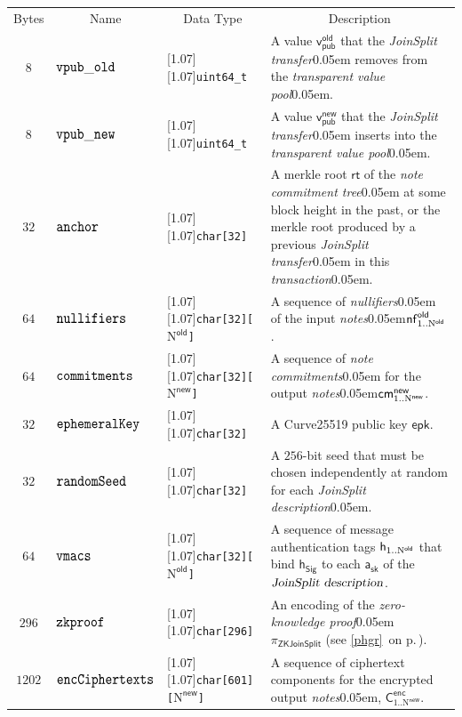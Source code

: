 \documentclass{article}
\renewcommand{\emph}[1]{\hspace{0.15em}{\fontfamily{pnc}\selectfont\scalebox{1.02}[0.999]{\textit{#1}}}\hspace{0.02em}}
\let\oldtexttt\texttt
\let\oldmathtt\mathtt
\renewcommand{\texttt}[1]{\scalebox{1.02}[1.07]{\oldtexttt{#1}}}
\renewcommand{\mathtt}[1]{\scalebox{1.02}[1.07]{$\oldmathtt{#1}$}}
\newcommand{\crossref}[1]{\autoref{#1}\, \emph{`\nameref*{#1}\kern -0.05em'} on p.\,\pageref*{#1}}
\newcommand{\changedcolor}{magenta}
\newcommand{\setchanged}{\color{\changedcolor}}
\numberwithin{theorem}{subsection}
\newcommand{\term}[1]{\textsl{#1}\kern 0.05em\xspace}
\newcommand{\notes}{\term{notes}}
\newcommand{\noteCommitments}{\term{note commitments}}
\newcommand{\noteCommitmentTree}{\term{note commitment tree}}
\newcommand{\joinSplitDescription}{\term{JoinSplit description}}
\newcommand{\joinSplitTransfer}{\term{JoinSplit transfer}}
\newcommand{\zeroKnowledgeProof}{\term{zero-knowledge proof}}
\newcommand{\transaction}{\term{transaction}}
\newcommand{\transparentValuePool}{\term{transparent value pool}}
\newcommand{\nullifiers}{\term{nullifiers}}
\newcommand{\AuthPrivate}{\mathsf{a_{sk}}}
\newcommand{\enc}{\mathsf{enc}}
\newcommand{\EphemeralPublic}{\mathsf{epk}}
\newcommand{\Ctext}{\mathsf{C}}
\newcommand{\TransmitCiphertext}[1]{\Ctext^\enc_{#1}}
\newcommand{\cmNew}[1]{\mathsf{{cm}^{new}_\mathnormal{#1}}}
\newcommand{\nf}{\mathsf{nf}}
\newcommand{\nfOld}[1]{\nf^\mathsf{old}_\mathnormal{#1}}
\newcommand{\vpubOldField}{\mathtt{vpub\_old}}
\newcommand{\vpubNewField}{\mathtt{vpub\_new}}
\newcommand{\anchorField}{\mathtt{anchor}}
\newcommand{\nullifiersField}{\mathtt{nullifiers}}
\newcommand{\commitments}{\mathtt{commitments}}
\newcommand{\ephemeralKey}{\mathtt{ephemeralKey}}
\newcommand{\encCiphertexts}{\mathtt{encCiphertexts}}
\newcommand{\randomSeed}{\mathtt{randomSeed}}
\newcommand{\heading}[1]{\multicolumn{1}{c|}{#1}}
\newcommand{\type}[1]{\texttt{#1}}
\newcommand{\JoinSplit}{\mathsf{ZKJoinSplit}}
\newcommand{\ProofJoinSplit}{\pi_\JoinSplit}
\newcommand{\zkproof}{\mathtt{zkproof}}
\newcommand{\hSig}{\mathsf{h_{Sig}}}
\newcommand{\h}[1]{\mathsf{h_{\mathnormal{#1}}}}
\newcommand{\NOld}{\mathrm{N}^\mathsf{old}}
\newcommand{\NNew}{\mathrm{N}^\mathsf{new}}
\newcommand{\allN}[1]{\mathrm{1}..\mathrm{N}^\mathsf{#1}}
\newcommand{\allOld}{\allN{old}}
\newcommand{\allNew}{\allN{new}}
\newcommand{\vmacs}{\mathtt{vmacs}}
\newcommand{\vpubOld}{\mathsf{v_{pub}^{old}}}
\newcommand{\vpubNew}{\mathsf{v_{pub}^{new}}}
\newcommand{\rt}{\mathsf{rt}}
\begin{document}
\begin{center}
\begin{tabularx}{0.92\textwidth}{|c|l|l|X|}
\hline
Bytes & \heading{Name} & \heading{Data Type} & \heading{Description} \\
\hhline{|=|=|=|=|}

\setchanged 8 &\setchanged $\vpubOldField$ &\setchanged \type{uint64\_t} &\mbox{}\setchanged
A value $\vpubOld$ that the \joinSplitTransfer removes from the \transparentValuePool. \\ \hline

$8$ & $\vpubNewField$ & \type{uint64\_t} & A value $\vpubNew$ that the \joinSplitTransfer inserts
into the \transparentValuePool. \\ \hline

$32$ & $\anchorField$ & \type{char[32]} & A merkle root $\rt$ of the \noteCommitmentTree at
some block height in the past, or the merkle root produced by a previous \joinSplitTransfer in
this \transaction. \\ \hline

$64$ & $\nullifiersField$ & \type{char[32][$\NOld$]} & A sequence of \nullifiers of the input
\notes $\nfOld{\allOld}$. \\ \hline

$64$ & $\commitments$ & \type{char[32][$\NNew$]} & A sequence of \noteCommitments for the
output \notes $\cmNew{\allNew}$. \\ \hline

\setchanged $32$ &\setchanged $\ephemeralKey$ &\setchanged \type{char[32]} &\mbox{}\setchanged
A Curve25519 public key $\EphemeralPublic$. \\ \hline

\setchanged $32$ &\setchanged $\randomSeed$ &\setchanged \type{char[32]} &\mbox{}\setchanged
A $256$-bit seed that must be chosen independently at random for each \joinSplitDescription. \\ \hline

$64$ & $\vmacs$ & \type{char[32][$\NOld$]} & A sequence of message authentication tags
$\h{\allOld}$ that bind $\hSig$ to each $\AuthPrivate$ of the
$\joinSplitDescription$. \\ \hline

$296$ & $\zkproof$ & \type{char[296]} & An encoding of the \zeroKnowledgeProof
$\ProofJoinSplit$ (see \crossref{phgr}). \\ \hline

$1202$ & $\encCiphertexts$ & \type{char[601][$\NNew$]} & A sequence of ciphertext
components for the encrypted output \notes, $\TransmitCiphertext{\allNew}$. \\ \hline

\end{tabularx}
\end{center}
\end{document}

